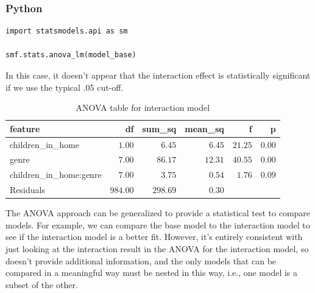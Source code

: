 \documentclass[
  letterpaper,
]{krantz}
\begin{document}
\subsubsection{Python}

\begin{verbatim}
import statsmodels.api as sm

smf.stats.anova_lm(model_base)
\end{verbatim}

In this case, it doesn't appear that the interaction effect is
statistically significant if we use the typical .05 cut-off.

\begin{longtable}{lrrrrr}

\caption{\label{tbl-anova-r}ANOVA table for interaction model}

\tabularnewline

\toprule
feature & df & sum\_sq & mean\_sq & f & p \\ 
\midrule\addlinespace[2.5pt]
children\_in\_home & \textcolor[HTML]{404040}{$1.00$} & \textcolor[HTML]{404040}{$6.45$} & \textcolor[HTML]{404040}{$6.45$} & \textcolor[HTML]{404040}{$21.25$} & \textcolor[HTML]{404040}{$0.00$} \\ 
genre & \textcolor[HTML]{404040}{$7.00$} & \textcolor[HTML]{404040}{$86.17$} & \textcolor[HTML]{404040}{$12.31$} & \textcolor[HTML]{404040}{$40.55$} & \textcolor[HTML]{404040}{$0.00$} \\ 
children\_in\_home:genre & \textcolor[HTML]{404040}{$7.00$} & \textcolor[HTML]{404040}{$3.75$} & \textcolor[HTML]{404040}{$0.54$} & \textcolor[HTML]{404040}{$1.76$} & \textcolor[HTML]{404040}{$0.09$} \\ 
Residuals & \textcolor[HTML]{404040}{$984.00$} & \textcolor[HTML]{404040}{$298.69$} & \textcolor[HTML]{404040}{$0.30$} & \textcolor[HTML]{404040}{} & \textcolor[HTML]{404040}{} \\ 
\bottomrule

\end{longtable}

The ANOVA approach can be generalized to provide a statistical test to
compare models. For example, we can compare the base model to the
interaction model to see if the interaction model is a better fit.
However, it's entirely consistent with just looking at the interaction
result in the ANOVA for the interaction model, so doesn't provide
additional information, and the only models that can be compared in a
meaningful way must be nested in this way, i.e., one model is a subset
of the other.
\end{document}
